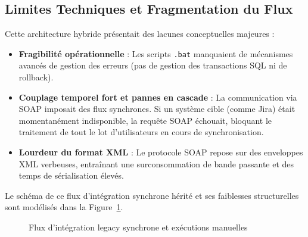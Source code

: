\subsection{Limites Techniques et Fragmentation du Flux}
Cette architecture hybride présentait des lacunes conceptuelles majeures :
\begin{itemize}
    \item \textbf{Fragibilité opérationnelle} : Les scripts \texttt{.bat} manquaient de mécanismes avancés de gestion des erreurs (pas de gestion des transactions SQL ni de rollback).
    \item \textbf{Couplage temporel fort et pannes en cascade} : La communication via SOAP imposait des flux synchrones. Si un système cible (comme Jira) était momentanément indisponible, la requête SOAP échouait, bloquant le traitement de tout le lot d'utilisateurs en cours de synchronisation.
    \item \textbf{Lourdeur du format XML} : Le protocole SOAP repose sur des enveloppes XML verbeuses, entraînant une surconsommation de bande passante et des temps de sérialisation élevés.
\end{itemize}

Le schéma de ce flux d'intégration synchrone hérité et ses faiblesses structurelles sont modélisés dans la Figure~\ref{fig:flux_legacy}.

\begin{figure}[H]
    \centering
    \caption{Flux d'intégration legacy synchrone et exécutions manuelles}
    \label{fig:flux_legacy}
\end{figure}

